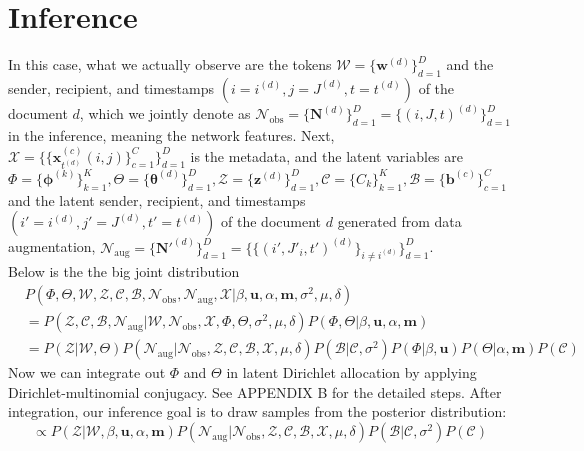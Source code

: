 \documentclass[a4paper]{article}
\begin{document}
\section{Inference} \label{sec: Inference}
In this case, what we actually observe are the tokens $\mathcal{W}=\{\boldsymbol{w}^{(d)} \}_{d=1}^{D}$ and the sender, recipient, and timestamps $(i=i^{(d)}, j=J^{(d)}, t=t^{(d)})$ of the document $d$, which we jointly denote as $\mathcal{N}_{\mbox{obs}} = \{\boldsymbol{N}^{(d)}\}_{d=1}^D=\{(i, J, t)^{(d)}\}_{d=1}^D$ in the inference, meaning the network features. Next,  $\mathcal{X}=\{\{\boldsymbol{x}^{(c)}_{t^{(d)}}(i, j)\}_{c=1}^C\}_{d=1}^{D}$ is the metadata, and the latent variables are $\Phi=\{\boldsymbol{\phi}^{(k)}\}_{k=1}^{K}, \Theta=\{\boldsymbol{\theta}^{(d)} \}_{d=1}^{D}, \mathcal{Z}=\{\boldsymbol{z}^{(d)} \}_{d=1}^{D}, \mathcal{C}=\{{C}_k \}_{k=1}^{K}, \mathcal{B}=\{\boldsymbol{b}^{(c)} \}_{c=1}^{C}$ and the latent sender, recipient, and timestamps $(i'=i^{(d)}, j'=J^{(d)}, t'=t^{(d)})$ of the document $d$ generated from data augmentation, $\mathcal{N}_{\mbox{aug}} = \{\boldsymbol{N}'^{(d)}\}_{d=1}^D=\{\{(i', J'_i, t')^{(d)}\}_{i\neq i^{(d)}}\}_{d=1}^D$.\\
 \newline 
 Below is the the big joint distribution
 \begin{equation}
 \begin{aligned}
 & P(\Phi, \Theta, \mathcal{W}, \mathcal{Z}, \mathcal{C}, \mathcal{B}, \mathcal{N}_{\mbox{obs}}, \mathcal{N}_{\mbox{aug}}, \mathcal{X}| \beta, \boldsymbol{u}, \alpha, \boldsymbol{m}, \sigma^2, \mu, \delta) \\& 
 =  P( \mathcal{Z}, \mathcal{C}, \mathcal{B},  \mathcal{N}_{\mbox{aug}}| \mathcal{W}, \mathcal{N}_{\mbox{obs}},  \mathcal{X}, \Phi, \Theta,\sigma^2, \mu, \delta) P(\Phi, \Theta |\beta, \boldsymbol{u}, \alpha, \boldsymbol{m})
 \\&= P(\mathcal{Z}| \mathcal{W}, \Theta)P(\mathcal{N}_{\mbox{aug}}|\mathcal{N}_{\mbox{obs}},  \mathcal{Z}, \mathcal{C}, \mathcal{B}, \mathcal{X}, \mu, \delta)P(\mathcal{B}|\mathcal{C}, \sigma^2)P(\Phi|\beta, \boldsymbol{u})P(\Theta|\alpha, \boldsymbol{m})P(\mathcal{C})
 \end{aligned}
 \end{equation}
 Now we can integrate out $\Phi$ and $\Theta$ in latent Dirichlet allocation by applying Dirichlet-multinomial conjugacy. See APPENDIX B for the detailed steps. After integration, our inference goal is to draw samples from the posterior distribution:
 \begin{equation}
 \propto P( \mathcal{Z}|\mathcal{W},\beta, \boldsymbol{u}, \alpha, \boldsymbol{m})P(\mathcal{N}_{\mbox{aug}}|\mathcal{N}_{\mbox{obs}}, \mathcal{Z}, \mathcal{C}, \mathcal{B},\mathcal{X}, \mu, \delta)P(\mathcal{B}|\mathcal{C}, \sigma^2)P(\mathcal{C})
 \end{equation}
\end{document}
